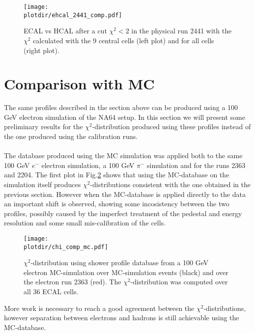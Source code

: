 \begin{figure}[h!]
  \begin{center}
    \texttt{[image: \\plotdir/ehcal\_2441\_comp.pdf]}
  \end{center}
  \caption{ECAL vs HCAL after a cut $\chi^2<2$ in the physical run
    2441 with the $\chi^2$ calculated with the 9 central cells (left
    plot) and for all cells (right plot).}
  \label{fig:ehcal_comp}
\end{figure}



\section{Comparison with MC}
\label{chapter3:sec:mc}
The same profiles described in the section above can be produced using
a 100 GeV electron simulation of the NA64 setup\cite{na64-simulation}. In
this section we will present some preliminary results for the
$\chi^2$-distribution produced using these profiles instead of the one
produced using the calibration runs.
\\
\\
The database produced using the MC simulation was applied both to the
same 100 GeV $e^-$ electron simulation, a 100 GeV $\pi^-$ simulation
and for the runs 2363 and 2204.  The first plot in
Fig.\ref{fig:chi_mc} shows that using the MC-database on the
simulation itself produces $\chi^{2}$-distributions consistent with
the one obtained in the previous section. However when the MC-database
is applied directly to the data an important shift is observed,
showing some incosistency between the two profiles, possibly caused by
the imperfect treatment of the pedestal and energy resolution and some
small mis-calibration of the cells.


\begin{figure}[h!]
  \begin{center}
    \texttt{[image: \\plotdir/chi\_comp\_mc.pdf]}
  \end{center}
  \caption{$\chi^2$-distribution using shower profile database from a
    100 GeV electron MC-simulation over MC-simulation events (black)
    and over the electron run 2363 (red). The $\chi^2$-distribution
    was computed over all 36 ECAL cells.}
  \label{fig:chi_mc}
\end{figure}
\clearpage


More work is necessary to reach a good agreement between the
$\chi^{2}$-distributions, however separation between electrons and
hadrons is still achievable using the MC-database. 

